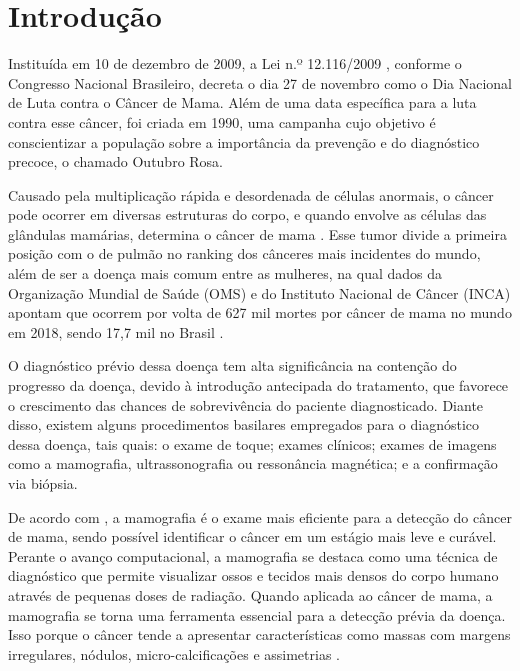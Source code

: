 
\section{\esp Introdução} \label{intro}

Instituída em 10 de dezembro de 2009, a Lei n.º 12.116/2009 , conforme o Congresso Nacional Brasileiro, decreta o dia 27 de novembro como o Dia Nacional de Luta contra o Câncer de Mama. Além de uma data específica para a luta contra esse câncer, foi criada em 1990, uma campanha cujo objetivo é conscientizar a população sobre a importância da prevenção e do diagnóstico precoce, o chamado Outubro Rosa.

Causado pela multiplicação rápida e desordenada de células anormais, o câncer pode ocorrer em diversas estruturas do corpo, e quando envolve as células das glândulas mamárias, determina o câncer de mama \cite{incaoquee}. Esse tumor divide a primeira posição com o de pulmão no ranking dos cânceres mais incidentes do mundo, além de ser a doença mais comum entre as mulheres, na qual dados da Organização Mundial de Saúde (OMS) e do Instituto Nacional de Câncer (INCA) apontam que ocorrem por volta de 627 mil mortes por câncer de mama no mundo em 2018, sendo 17,7 mil no Brasil \cite{boletimepidemiologico}.

O diagnóstico prévio dessa doença tem alta significância na contenção do progresso da doença, devido à introdução antecipada do tratamento, que favorece o crescimento das chances de sobrevivência do paciente diagnosticado. Diante disso, existem alguns procedimentos basilares empregados para o diagnóstico dessa doença, tais quais: o exame de toque; exames clínicos; exames de imagens como a mamografia, ultrassonografia ou ressonância magnética; e a confirmação via biópsia.

De acordo com , a mamografia é o exame mais eficiente para a detecção do câncer de mama, sendo possível identificar o câncer em um estágio mais leve e curável. Perante o avanço computacional, a mamografia se destaca como uma técnica de diagnóstico que permite visualizar ossos e tecidos mais densos do corpo humano através de pequenas doses de radiação. Quando aplicada ao câncer de mama, a mamografia se torna uma ferramenta essencial para a detecção prévia da doença. Isso porque o câncer tende a apresentar características como massas com margens irregulares, nódulos, micro-calcificações e assimetrias \cite{detection}.

